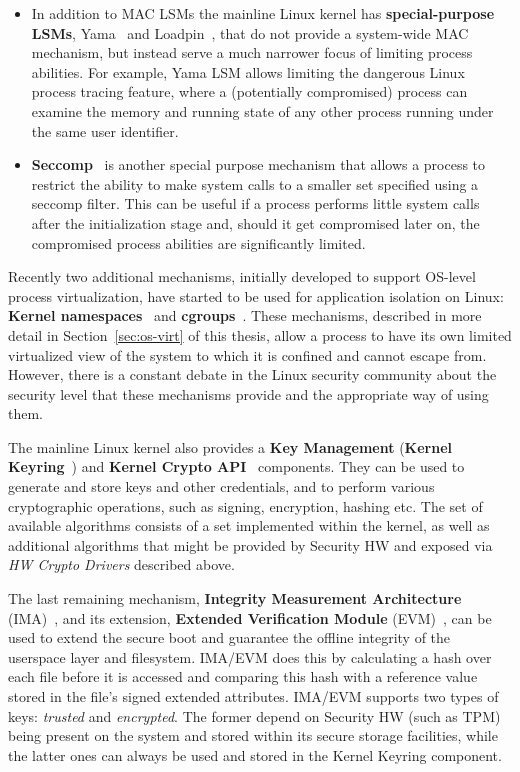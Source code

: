\begin{itemize}
	\item In addition to MAC LSMs the mainline Linux kernel has \textbf{special-purpose LSMs}, Yama~\cite{yama} and Loadpin~\cite{loadpin}, that do not provide a system-wide MAC mechanism, but instead serve a much narrower focus of limiting process abilities. For example, Yama LSM allows limiting the dangerous Linux process tracing feature, where a (potentially compromised) process can examine the memory and running state of any other process running under the same user identifier. 
	\item \textbf{Seccomp}~\cite{seccomp2016} is another special purpose mechanism that allows a process to restrict the ability to make system calls to a smaller set specified using a seccomp filter. This can be useful if a process performs little system calls after the initialization stage and, should it get compromised later on, the compromised process abilities are significantly limited.
\end{itemize} 

Recently two additional mechanisms, initially developed to support OS-level process virtualization, have started to be used for application isolation on Linux: \textbf{Kernel namespaces}~\cite{biederman2006} and \textbf{cgroups}~\cite{cgroupsv2}. These mechanisms, described in more detail in Section~\ref{sec:os-virt} of this thesis, allow a process to have its own limited virtualized view of the system to which it is confined and cannot escape from. However, there is a constant debate in the Linux security community about the security level that these mechanisms provide and the appropriate way of using them.   

The mainline Linux kernel also provides a \textbf{Key Management} (\textbf{Kernel Keyring}~\cite{keyrings}) and \textbf{Kernel Crypto API}~\cite{kernelcryptoapi} components. They can be used to generate and store keys and other credentials, and to perform various cryptographic operations, such as signing, encryption, hashing etc. The set of available algorithms consists of a set implemented within the kernel, as well as additional algorithms that might be provided by Security HW and exposed via \textit{HW Crypto Drivers} described above.

The last remaining mechanism, \textbf{Integrity Measurement Architecture} (IMA)~\cite{ima}, and its extension, \textbf{Extended Verification Module} (EVM)~\cite{ima}, can be used to extend the secure boot and guarantee the offline integrity of the userspace layer and filesystem. IMA/EVM does this by calculating a hash over each file before it is accessed and comparing this hash with a reference value stored in the file's signed extended attributes. IMA/EVM supports two types of keys: \textit{trusted} and \textit{encrypted}. The former depend on Security HW (such as TPM) being present on the system and stored within its secure storage facilities, while the latter ones can always be used and stored in the Kernel Keyring component. 

